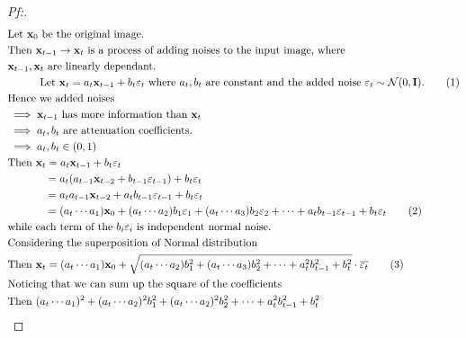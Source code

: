 \documentclass{article}
\begin{document}
\begin{proof}[\textit{Pf:}]
    \allowdisplaybreaks
    \begin{align}
        &\text{Let } \mathbf{x}_0 \text{  be the original image.} \notag \\
        &\text{Then } \mathbf{x}_{t-1} \to \mathbf{x}_t \text{ is a process of adding noises to the input image, where } \notag \\
        &\mathbf{x}_{t-1}, \mathbf{x}_t \text{ are linearly dependant.} \notag \\
        &\qquad\quad \text{Let } \mathbf{x}_t = a_t \mathbf{x}_{t-1} + b_t\varepsilon _t \text{ where } a_t, b_t
        \text{ are constant and the added noise } \varepsilon _t \sim \mathcal{N}(0, \mathbf{I}). \tag{1} \\
        &\text{Hence we added noises} \notag \\
        &\implies \mathbf{x}_{t-1} \text{ has more information than } \mathbf{x}_t \notag \\
        &\implies a_t, b_t \text{ are attenuation coefficients. } \notag \\
        &\implies a_t, b_t \in (0,1) \notag \\
        &\text{Then } \mathbf{x}_t = a_t \mathbf{x}_{t-1} + b_t \varepsilon _t \notag \\
        &\quad\quad\quad\,\,\, = a_t(a_{t-1} \mathbf{x}_{t-2} + b_{t-1} \varepsilon _{t-1}) + b_t \varepsilon _t \notag \\
        &\quad\quad\quad\,\,\, = a_t a_{t-1} \mathbf{x}_{t-2} + a_t b_{t-1} \varepsilon _{t-1} + b_t \varepsilon _t \notag \\
        &\quad\quad\quad\,\,\, = (a_t \cdots a_1)\mathbf{x}_{0} + (a_t \cdots a_2)b_1 \varepsilon _1 
        + (a_t \cdots a_3)b_2 \varepsilon _2 + \cdots + a_t b_{t-1} \varepsilon _{t-1} + b_t \varepsilon _t \tag{2} \\
        &\text{while each term of the } b_i \varepsilon _i \text{ is independent normal noise.} \notag \\
        &\text{Considering the superposition of Normal distribution } \notag \\
        &\text{Then } \mathbf{x}_t = (a_t \cdots a_1)\mathbf{x}_0 + \sqrt{(a_t \cdots a_2)b_1^2 + (a_t \cdots a_3)b_2^2 + \cdots + a_t^2b_{t-1}^2 + b_t^2} \cdot  \overline{\varepsilon _t} \tag{3} \\
        &\text{Noticing that we can sum up the square of the coefficients} \notag\\
        &\text{Then }(a_{t}\cdots a_{1})^{2}+(a_{t}\cdots a_{2})^{2}b_{1}^{2}+(a_{t}\cdots a_{2})^{2}b_{2}^{2}+\cdots+a_{t}^{2}b_{t-1}^{2}+b_{t}^{2} \notag \\

\end{align}
\end{proof}
\end{document}
